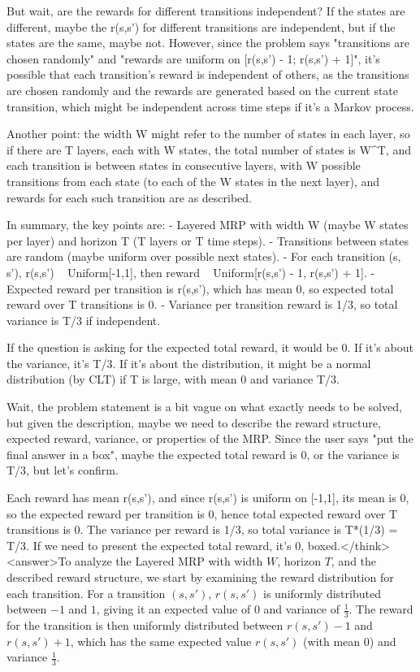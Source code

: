 But wait, are the rewards for different transitions independent? If the states are different, maybe the r(s,s') for different transitions are independent, but if the states are the same, maybe not. However, since the problem says "transitions are chosen randomly" and "rewards are uniform on [r(s,s') - 1; r(s,s') + 1]", it's possible that each transition's reward is independent of others, as the transitions are chosen randomly and the rewards are generated based on the current state transition, which might be independent across time steps if it's a Markov process.

Another point: the width W might refer to the number of states in each layer, so if there are T layers, each with W states, the total number of states is W^T, and each transition is between states in consecutive layers, with W possible transitions from each state (to each of the W states in the next layer), and rewards for each such transition are as described.

In summary, the key points are:
- Layered MRP with width W (maybe W states per layer) and horizon T (T layers or T time steps).
- Transitions between states are random (maybe uniform over possible next states).
- For each transition (s, s'), r(s,s') ~ Uniform[-1,1], then reward ~ Uniform[r(s,s') - 1, r(s,s') + 1].
- Expected reward per transition is r(s,s'), which has mean 0, so expected total reward over T transitions is 0.
- Variance per transition reward is 1/3, so total variance is T/3 if independent.

If the question is asking for the expected total reward, it would be 0. If it's about the variance, it's T/3. If it's about the distribution, it might be a normal distribution (by CLT) if T is large, with mean 0 and variance T/3.

Wait, the problem statement is a bit vague on what exactly needs to be solved, but given the description, maybe we need to describe the reward structure, expected reward, variance, or properties of the MRP. Since the user says "put the final answer in a box", maybe the expected total reward is 0, or the variance is T/3, but let's confirm.

Each reward has mean r(s,s'), and since r(s,s') is uniform on [-1,1], its mean is 0, so the expected reward per transition is 0, hence total expected reward over T transitions is 0. The variance per reward is 1/3, so total variance is T*(1/3) = T/3. If we need to present the expected total reward, it's 0, boxed.</think><answer>To analyze the Layered MRP with width \( W \), horizon \( T \), and the described reward structure, we start by examining the reward distribution for each transition. For a transition \( (s, s') \), \( r(s, s') \) is uniformly distributed between \(-1\) and \(1\), giving it an expected value of \( 0 \) and variance of \( \frac{1}{3} \). The reward for the transition is then uniformly distributed between \( r(s, s') - 1 \) and \( r(s, s') + 1 \), which has the same expected value \( r(s, s') \) (with mean \( 0 \)) and variance \( \frac{1}{3} \).

